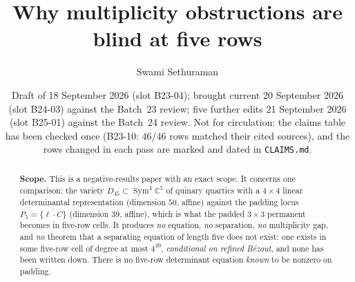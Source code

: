 \documentclass[11pt]{amsart}
\title[Why multiplicity obstructions are blind at five rows]
{Why multiplicity obstructions are blind at five rows}
\author{Swami Sethuraman}
\date{Draft of 18 September 2026 (slot B23-04); brought current 20 September 2026 (slot B24-03)
against the Batch~23 review; five further edits 21 September 2026 (slot B25-01) against the
Batch~24 review. Not for circulation: the claims table has been checked once
(B23-10: $46/46$ rows matched their cited sources), and the rows changed in each pass are
marked and dated in \texttt{CLAIMS.md}.}
\theoremstyle{plain}
\theoremstyle{definition}
\theoremstyle{remark}
\DeclareMathOperator{\Sym}{Sym}
\newcommand{\bC}{\mathbb{C}}
\newcommand{\Dff}{D_{45}}
\newcommand{\Pf}{P_{5}}
\begin{document}
\begin{abstract}
\textbf{Scope.} This is a negative-results paper with an exact scope. It concerns one comparison:
the variety $\Dff\subset\Sym^4\bC^5$ of quinary quartics with a $4\times4$ linear determinantal
representation (dimension $50$, affine) against the padding locus
$\Pf=\overline{\{\ell\cdot C\}}$ (dimension $39$, affine), which is what the padded
$3\times3$ permanent becomes in five-row cells. It produces \emph{no} equation, \emph{no}
separation, \emph{no} multiplicity gap, and \emph{no} theorem that a separating equation of length
five does not exist: one exists in some five-row cell of degree at most $4^{49}$,
\emph{conditional on refined B\'ezout}, and none has been written down. There is no five-row
determinant equation \emph{known} to be nonzero on padding.


\end{abstract}
\end{document}
